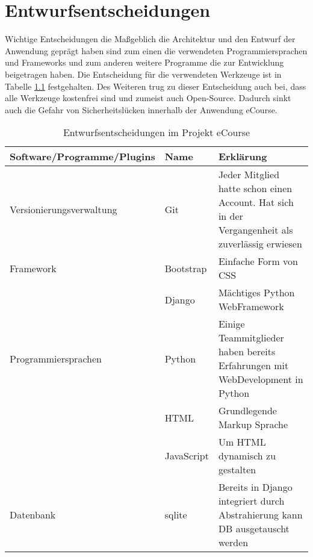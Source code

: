 \chapter{Entwurfsentscheidungen}
\label{sec:Entwurf}
Wichtige Entscheidungen die Maßgeblich die Architektur und den Entwurf der Anwendung geprägt haben sind zum einen die verwendeten Programmiersprachen und \gls{Framework}s und zum anderen weitere Programme die zur Entwicklung beigetragen haben.
Die Entscheidung für die verwendeten Werkzeuge ist in Tabelle \ref{tab:Entwurfsentscheidungen} festgehalten. Des Weiteren trug zu dieser Entscheidung auch bei, dass alle Werkzeuge kostenfrei sind und zumeist auch Open-Source. Dadurch sinkt auch die Gefahr von Sicherheitslücken innerhalb der Anwendung eCourse.

\begin{table}[H]
\centering
\begin{tabularx}{\textwidth}{|l|l|X|} 
 \hline 
Software/Programme/Plugins & Name & Erklärung \\ 
\hline
Versionierungsverwaltung & Git & Jeder Mitglied hatte schon einen Account. Hat sich in der Vergangenheit als zuverlässig erwiesen \\ 
\hline
Framework & Bootstrap & Einfache Form von CSS \\ 
\hline
 & Django & Mächtiges Python WebFramework \\ 
\hline
Programmiersprachen & Python & Einige Teammitglieder haben bereits Erfahrungen mit WebDevelopment in Python \\ 
\hline
 & HTML & Grundlegende Markup Sprache  \\ 
\hline
 & JavaScript & Um HTML dynamisch zu gestalten \\ 
\hline
Datenbank & sqlite & Bereits in Django integriert durch Abstrahierung kann DB ausgetauscht werden \\ 
\hline
\end{tabularx}
\caption{Entwurfsentscheidungen im Projekt eCourse}
\label{tab:Entwurfsentscheidungen}
\end{table}
